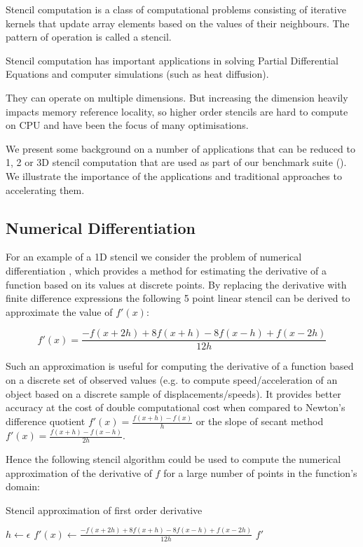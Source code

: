 Stencil computation is a class of computational problems consisting of
iterative kernels that update array elements based on the values of
their neighbours. The pattern of operation is called a stencil.

Stencil computation has important applications in solving Partial
Differential Equations and computer simulations (such as heat
diffusion).

They can operate on multiple dimensions. But increasing the dimension
heavily impacts memory reference locality, so higher order stencils
are hard to compute on CPU and have been the focus of many
optimisations.

We present some background on a number of applications that can be
reduced to 1, 2 or 3D stencil computation that are used as part of our
benchmark suite (). We illustrate the importance
of the applications and traditional approaches to accelerating them.

\subsection{Numerical Differentiation}

For an example of a 1D stencil we consider the problem of numerical
differentiation \cite{numericaldiff}, which provides a method for
estimating the derivative of a function based on its values at
discrete points. By replacing the derivative with finite difference
expressions the following 5 point linear stencil can be derived to
approximate the value of $f'(x)$:

\begin{equation}
  f'(x) = \frac{-f(x + 2h) + 8f(x+h) - 8f(x-h) + f(x - 2h)}{12h}
\end{equation}

Such an approximation is useful for computing the derivative of a
function based on a discrete set of observed values (e.g. to compute
speed/acceleration of an object based on a discrete sample of
displacements/speeds). It provides better accuracy at the cost of
double computational cost when compared to Newton's difference
quotient $f'(x) = \frac{f(x + h) - f(x)}{h}$ or the slope of secant
method $f'(x)=\frac{f(x+h) - f(x - h)}{2h}$.

Hence the following stencil algorithm could be used to compute the
numerical approximation of the derivative of $f$ for a large number of
points in the function's domain:

\begin{algorithm}
  \caption{Stencil approximation of first order derivative}
  \begin{algorithmic}
    \State $h \gets \epsilon$
    \State $f'(x) \gets  \frac{-f(x + 2h) + 8f(x+h) - 8f(x-h) + f(x - 2h)}{12h}$
    \EndFor
    \State \Return $f'$
    \EndFunction
  \end{algorithmic}
\end{algorithm}

